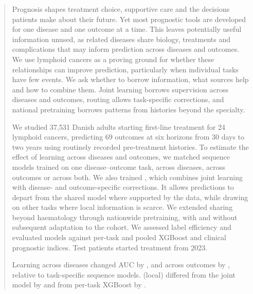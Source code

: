 \begin{abstract}
Prognosis shapes treatment choice, supportive care and the decisions patients
make about their future. Yet most prognostic tools are developed for one disease and
one outcome at a time. This leaves potentially useful information unused, as
related diseases share biology, treatments and complications that may inform
prediction across diseases and outcomes. We use lymphoid cancers as a proving
ground for whether these relationships can improve prediction, particularly
when individual tasks have few events. We ask whether to borrow information, what sources help and how to combine
them. Joint learning borrows supervision across diseases and outcomes, routing
allows task-specific corrections, and national pretraining borrows patterns
from histories beyond the specialty.

We studied 37,531 Danish adults starting first-line treatment for 24 lymphoid
cancers, predicting 69 outcomes at six horizons from 30 days to two years using
routinely recorded pre-treatment histories. To estimate the effect of learning
across diseases and outcomes, we matched sequence models trained on one
disease--outcome task, across diseases, across outcomes or across both. We also
trained \opera{}, which combines joint learning with disease- and
outcome-specific corrections. It allows predictions to depart from the shared
model where supported by the data, while drawing on other tasks where local
information is scarce. We extended sharing beyond haematology through nationwide pretraining,
with and without subsequent adaptation to the cohort. We assessed label
efficiency and evaluated models against per-task and pooled XGBoost and clinical
prognostic indices. Test patients started treatment from 2023.

Learning across diseases changed AUC by , and across outcomes
by , relative to task-specific sequence models. \opera{} (local)
differed from the joint model by  and from per-task XGBoost
by .

\end{abstract}

